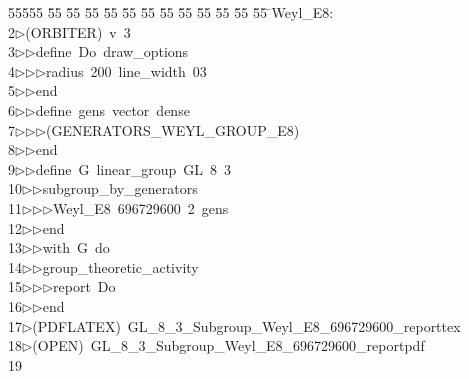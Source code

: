 %
%
\begin{tabbing}
55555 \= 55 \= 55 \= 55 \= 55 \= 55 \= 55 \= 55 \= 55 \= 55 \= 55 \= 55 \= 55 \= \>Weyl\_E8:\\[0pt]
2\>$\triangleright$\>(ORBITER)\ v\ 3\ \\[0pt]
3\>$\triangleright$\>$\triangleright$\>define\ Do\ draw\_options\ \\[0pt]
4\>$\triangleright$\>$\triangleright$\>$\triangleright$\>radius\ 200\ line\_width\ 03\ \\[0pt]
5\>$\triangleright$\>$\triangleright$\>end\ \\[0pt]
6\>$\triangleright$\>$\triangleright$\>define\ gens\ vector\ dense\ \\[0pt]
7\>$\triangleright$\>$\triangleright$\>$\triangleright$\>(GENERATORS\_WEYL\_GROUP\_E8)\ \\[0pt]
8\>$\triangleright$\>$\triangleright$\>end\ \\[0pt]
9\>$\triangleright$\>$\triangleright$\>define\ G\ linear\_group\ GL\ 8\ 3\ \\[0pt]
10\>$\triangleright$\>$\triangleright$\>subgroup\_by\_generators\ \\[0pt]
11\>$\triangleright$\>$\triangleright$\>$\triangleright$\>Weyl\_E8\ 696729600\ 2\ gens\ \ \\[0pt]
12\>$\triangleright$\>$\triangleright$\>end\ \\[0pt]
13\>$\triangleright$\>$\triangleright$\>with\ G\ do\ \\[0pt]
14\>$\triangleright$\>$\triangleright$\>group\_theoretic\_activity\ \\[0pt]
15\>$\triangleright$\>$\triangleright$\>$\triangleright$\>report\ Do\ \\[0pt]
16\>$\triangleright$\>$\triangleright$\>end\\[0pt]
17\>$\triangleright$\>(PDFLATEX)\ GL\_8\_3\_Subgroup\_Weyl\_E8\_696729600\_reporttex\\[0pt]
18\>$\triangleright$\>(OPEN)\ GL\_8\_3\_Subgroup\_Weyl\_E8\_696729600\_reportpdf\\[0pt]
19\>\end{tabbing}
